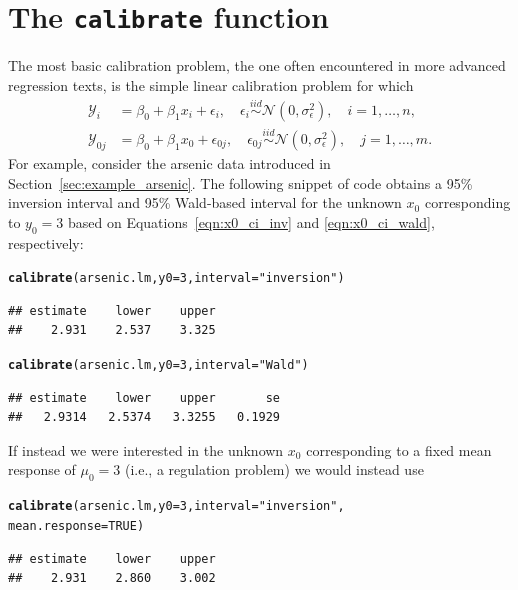 \documentclass[cmfont,usenames,dvipsnames,leqno]{afit-etd}\usepackage[]{graphicx}\usepackage[]{color}
\makeatletter
\newcommand{\hlnum}[1]{\textcolor[rgb]{0.686,0.059,0.569}{#1}}%
\newcommand{\hlstr}[1]{\textcolor[rgb]{0.192,0.494,0.8}{#1}}%
\newcommand{\hlstd}[1]{\textcolor[rgb]{0.345,0.345,0.345}{#1}}%
\newcommand{\hlkwc}[1]{\textcolor[rgb]{0.333,0.667,0.333}{#1}}%
\newcommand{\hlkwd}[1]{\textcolor[rgb]{0.737,0.353,0.396}{\textbf{#1}}}%
\newenvironment{kframe}{%
 \def\at@end@of@kframe{}%
 \ifinner\ifhmode%
  \def\at@end@of@kframe{\end{minipage}}%
  \begin{minipage}{\columnwidth}%
 \fi\fi%
 \def\FrameCommand##1{\hskip\@totalleftmargin \hskip-\fboxsep
 \colorbox{shadecolor}{##1}\hskip-\fboxsep
     \hskip-\linewidth \hskip-\@totalleftmargin \hskip\columnwidth}%
 \MakeFramed {\advance\hsize-\width
   \@totalleftmargin\z@ \linewidth\hsize
   \@setminipage}}%
 {\par\unskip\endMakeFramed%
 \at@end@of@kframe}
\newenvironment{knitrout}{}{} %
\renewenvironment{knitrout}{\begin{singlespace}}{\end{singlespace}}
\newcommand{\code}[1]{\texttt{\small{#1}}}
\makeatother
\begin{document}
\section{The \code{calibrate} function}
The most basic calibration problem, the one often encountered in more advanced regression texts, is the simple linear calibration problem for which
\begin{align*}
  \mathcal{Y}_i &= \beta_0 + \beta_1 x_i + \epsilon_i, \quad \epsilon_i \stackrel{iid}{\sim} \mathcal{N}\left(0, \sigma_\epsilon^2\right), \quad i = 1, \dotsc, n, \\
  \mathcal{Y}_{0j} &= \beta_0 + \beta_1 x_0 + \epsilon_{0j}, \quad \epsilon_{0j} \stackrel{iid}{\sim} \mathcal{N}\left(0, \sigma_\epsilon^2\right), \quad j = 1, \dotsc, m.
\end{align*}
For example, consider the arsenic data introduced in Section~\ref{sec:example_arsenic}. The following snippet of code obtains a 95\% inversion interval and 95\% Wald-based interval for the unknown $x_0$ corresponding to $y_0 = 3$ based on Equations~\eqref{eqn:x0_ci_inv} and \eqref{eqn:x0_ci_wald}, respectively:

\begin{knitrout}
\color{fgcolor}\begin{kframe}
\begin{alltt}
\hlkwd{calibrate}\hlstd{(arsenic.lm,} \hlkwc{y0} \hlstd{=} \hlnum{3}\hlstd{,} \hlkwc{interval} \hlstd{=} \hlstr{"inversion"}\hlstd{)}
\end{alltt}
\begin{verbatim}
## estimate    lower    upper 
##    2.931    2.537    3.325
\end{verbatim}
\begin{alltt}
\hlkwd{calibrate}\hlstd{(arsenic.lm,} \hlkwc{y0} \hlstd{=} \hlnum{3}\hlstd{,} \hlkwc{interval} \hlstd{=} \hlstr{"Wald"}\hlstd{)}
\end{alltt}
\begin{verbatim}
## estimate    lower    upper       se 
##   2.9314   2.5374   3.3255   0.1929
\end{verbatim}
\end{kframe}
\end{knitrout}


\noindent If instead we were interested in the unknown $x_0$ corresponding to a fixed mean response of $\mu_0 = 3$ (i.e., a regulation problem) we would instead use

\begin{knitrout}
\color{fgcolor}\begin{kframe}
\begin{alltt}
\hlkwd{calibrate}\hlstd{(arsenic.lm,} \hlkwc{y0} \hlstd{=} \hlnum{3}\hlstd{,} \hlkwc{interval} \hlstd{=} \hlstr{"inversion"}\hlstd{,}
    \hlkwc{mean.response} \hlstd{=} \hlnum{TRUE}\hlstd{)}
\end{alltt}
\begin{verbatim}
## estimate    lower    upper 
##    2.931    2.860    3.002
\end{verbatim}
\end{kframe}
\end{knitrout}
\end{document}
